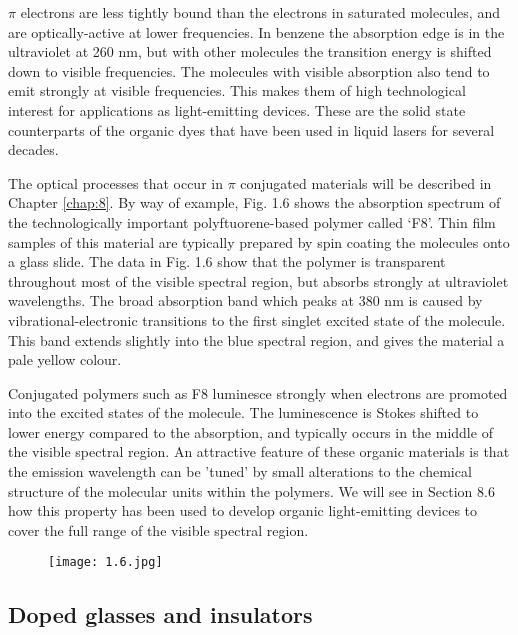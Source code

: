 \documentclass[12pt]{book}
\begin{document}
$\pi$ electrons are less tightly bound than the electrons in saturated molecules, and are optically-active at lower frequencies. In benzene the absorption edge is in the ultraviolet at 260 nm, but with other molecules the transition energy is shifted down to visible frequencies. The molecules with visible absorption also tend to emit strongly at visible frequencies. This makes them of high technological interest for applications as light-emitting devices. These are the solid state counterparts of the organic dyes that have been used in liquid lasers for several decades.

The optical processes that occur in $\pi$ conjugated materials will be described in Chapter \ref{chap:8}. By way of example, Fig. 1.6 shows the absorption spectrum of the technologically important polyftuorene-based polymer called `F8'. Thin film samples of this material are typically prepared by spin coating the molecules onto a glass slide. The data in Fig. 1.6 show that the polymer is transparent throughout most of the visible spectral region, but absorbs strongly at ultraviolet wavelengths. The broad absorption band which peaks at 380 nm is caused by vibrational-electronic transitions to the first singlet excited state of the molecule. This band extends slightly into the blue spectral region, and gives the material a pale yellow colour.

Conjugated polymers such as F8 luminesce strongly when electrons are promoted into the excited states of the molecule. The luminescence is Stokes shifted to lower energy compared to the absorption, and typically occurs in the middle of the visible spectral region. An attractive feature of these organic materials is that the emission wavelength can be 'tuned' by small alterations to the chemical structure of the molecular units within the polymers. We will see in Section 8.6 how this property has been used to develop organic light-emitting devices to cover the full range of the visible spectral region.

\begin{figure}[htbp]
  \centering
  \texttt{[image: 1.6.jpg]}\\ \label{fig:1.6}
\end{figure}

\subsection{Doped glasses and insulators}
\end{document}
